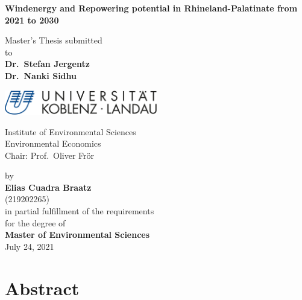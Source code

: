\documentclass[a4paper,11pt]{article}
\begin{document}
\thispagestyle{empty}
\begin{center}
  \vspace*{5mm}
  \linespread{1.5}
  {\huge{\bf Windenergy and Repowering potential in Rhineland-Palatinate from 2021 to 2030}\par}\vspace{1cm}
  Master's Thesis submitted \\\vspace{0.5cm}
  to \\\vspace{0.5cm}
  \textbf{Dr.~Stefan Jergentz} \\
  \textbf{Dr.~Nanki Sidhu} \\\vspace{1.5cm}
  
  
  \includegraphics[width=0.5\textwidth]{Uni-Logo-2.jpg}
  
  Institute of Environmental Sciences \\
  Environmental Economics \\
   Chair: Prof.~Oliver Frör \\  \vspace{1cm}

  
  
  by \\\vspace{0.5cm}
  \textbf{Elias Cuadra Braatz} \\
  (219202265) \\
  
  \medskip
  \medskip
  in partial fulfillment of the requirements \\
  for the degree of \\
  \textbf{Master of Environmental Sciences} \\\vspace{0.5cm}
  July 24, 2021
  
\end{center}


\newpage
\tableofcontents
\clearpage

\newpage
\hypertarget{abstract}{%
\section*{Abstract}\label{abstract}}
\end{document}
